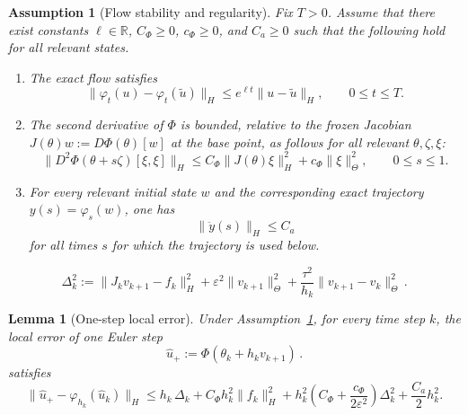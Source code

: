 \documentclass[10pt,a4paper]{amsart}
\newtheorem{assumption}{Assumption}
\newtheorem{lemma}{Lemma}
\newcommand{\R}{\mathbb{R}}
\newcommand{\norm}[1]{\lVert #1\rVert}
\newcommand{\tc}[1]{#1}
\begin{document}
\begin{assumption}[Flow stability and regularity]
  \label{ass:flow_stability_new}
  Fix $T>0$.
  Assume that there exist constants $\ell\in\R$, $C_\Phi\ge0$, $c_\Phi\ge0$, and $C_a\ge0$ such that the following hold for all relevant states.
  \begin{enumerate}[label=\textnormal{(\roman*)},leftmargin=2.5em]
    \item The exact flow satisfies
          \begin{equation}
            \norm{\varphi_t(u)-\varphi_t(\widetilde u)}_H
            \le e^{\ell t}\norm{u-\widetilde u}_H,
            \qquad 0\le t\le T.
            \label{eq:flow_stability_new}
          \end{equation}
    \item The second derivative of $\Phi$ is bounded, relative to the frozen Jacobian $J(\theta)w:=D\Phi(\theta)[w]$ at the base point, as follows for all relevant $\theta,\zeta,\xi$:
          \begin{equation}
            \norm{D^2\Phi(\theta+s\zeta)[\xi,\xi]}_H
            \le
            C_\Phi\norm{J(\theta)\xi}_H^2
            +
            c_\Phi\norm{\xi}_\Theta^2,
            \qquad 0\le s\le 1.
            \label{eq:D2Phi_bound_new}
          \end{equation}
    \item For every relevant initial state $w$ and the corresponding exact trajectory $y(s)=\varphi_s(w)$, one has
          \[
            \norm{\ddot y(s)}_H\le C_a
          \]
          for all times $s$ for which the trajectory is used below.
  \end{enumerate}
\end{assumption}

\begin{equation}
  \Delta_k^2
  :=
  \norm{J_kv_{k+1}-f_k}_H^2
  +
  \varepsilon^2\norm{v_{k+1}}_\Theta^2
  +
  \frac{\tau^2}{h_k}\norm{v_{k+1}-v_k}_\Theta^2\,.
  \label{eq:Delta_min_error}
\end{equation}

\begin{lemma}[One-step local error]
  \label{lem:local_error_new}
  Under Assumption~\ref{ass:flow_stability_new}, for every time step $k$,
  the local error of one Euler step
  \begin{equation}\label{eq:one_step_uplus}
    \hat{u}_+ := \Phi(\theta_k + h_kv_{k + 1})\,.
  \end{equation}
  satisfies
  \begin{equation}
    \norm{\hat u_+-\varphi_{h_k}(\hat u_k)}_H
    \le
    h_k\,\Delta_k
    +
    C_\Phi h_k^2\norm{f_k}_H^2
    +
    \tc{
    h_k^2
    \left(
    C_\Phi+\frac{c_\Phi}{2\varepsilon^2}
    \right)\Delta_k^2}
    +
    \frac{C_a}{2}h_k^2 .
    \label{eq:local_error_bound_new}
  \end{equation}
\end{lemma}
\end{document}

